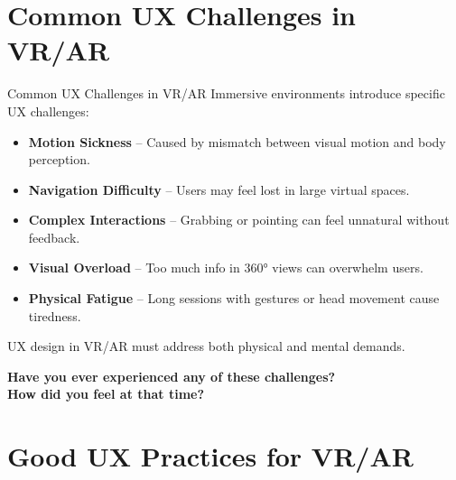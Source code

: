 \documentclass[aspectratio=169, table]{beamer}
\begin{document}
\section{Common UX Challenges in VR/AR}
\begin{frame}{Common UX Challenges in VR/AR}
	\vspace{20pt}
	Immersive environments introduce specific UX challenges:
	
	\vspace{5pt}
	\begin{itemize}
		\item \textbf{Motion Sickness} – Caused by mismatch between visual motion and body perception.
		\item \textbf{Navigation Difficulty} – Users may feel lost in large virtual spaces.
		\item \textbf{Complex Interactions} – Grabbing or pointing can feel unnatural without feedback.
		\item \textbf{Visual Overload} – Too much info in 360° views can overwhelm users.
		\item \textbf{Physical Fatigue} – Long sessions with gestures or head movement cause tiredness.
	\end{itemize}
	
	\vspace{5pt}
	UX design in VR/AR must address both physical and mental demands.
	
	\vspace{5pt}
	\centering
	\large
	\textbf{Have you ever experienced any of these challenges?\\How did you feel at that time?}
\end{frame}


\section{Good UX Practices for VR/AR}
\end{document}
